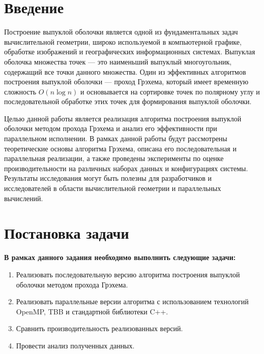 \documentclass{report}
\begin{document}
\setcounter{page}{2}

\tableofcontents
\newpage

\section*{Введение}
\par Построение выпуклой оболочки является одной из фундаментальных задач вычислительной геометрии, широко используемой в компьютерной графике, обработке изображений и географических информационных системах. Выпуклая оболочка множества точек — это наименьший выпуклый многоугольник, содержащий все точки данного множества. Один из эффективных алгоритмов построения выпуклой оболочки — проход Грэхема, который имеет временную сложность \(O(n \log n)\) и основывается на сортировке точек по полярному углу и последовательной обработке этих точек для формирования выпуклой оболочки.

\par Целью данной работы является реализация алгоритма построения выпуклой оболочки методом прохода Грэхема и анализ его эффективности при параллельном исполнении. В рамках данной работы будут рассмотрены теоретические основы алгоритма Грэхема, описана его последовательная и параллельная реализации, а также проведены эксперименты по оценке производительности на различных наборах данных и конфигурациях системы. Результаты исследования могут быть полезны для разработчиков и исследователей в области вычислительной геометрии и параллельных вычислений.

\newpage

\section*{Постановка задачи}
\par \textbf{В рамках данного задания необходимо выполнить следующие задачи:}
\begin{enumerate}
\item Реализовать последовательную версию алгоритма построения выпуклой оболочки методом прохода Грэхема.
\item Реализовать параллельные версии алгоритма с использованием технологий OpenMP, TBB и стандартной библиотеки C++.
\item Сравнить производительность реализованных версий.
\item Провести анализ полученных данных.
\end{enumerate}
\newpage
\end{document}
